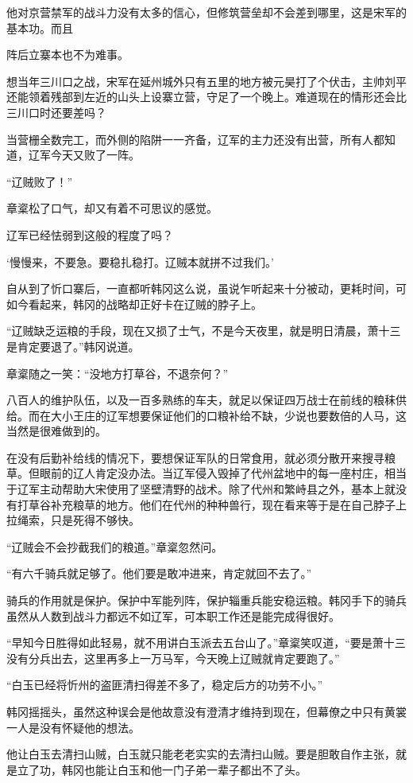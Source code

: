 他对京营禁军的战斗力没有太多的信心，但修筑营垒却不会差到哪里，这是宋军的基本功。而且

阵后立寨本也不为难事。

想当年三川口之战，宋军在延州城外只有五里的地方被元昊打了个伏击，主帅刘平还能领着残部到左近的山头上设寨立营，守足了一个晚上。难道现在的情形还会比三川口时还要差吗？

当营栅全数完工，而外侧的陷阱一一齐备，辽军的主力还没有出营，所有人都知道，辽军今天又败了一阵。

“辽贼败了！”

章楶松了口气，却又有着不可思议的感觉。

辽军已经怯弱到这般的程度了吗？

‘慢慢来，不要急。要稳扎稳打。辽贼本就拼不过我们。’

自从到了忻口寨后，一直都听韩冈这么说，虽说乍听起来十分被动，更耗时间，可如今看起来，韩冈的战略却正好卡在辽贼的脖子上。

“辽贼缺乏运粮的手段，现在又损了士气，不是今天夜里，就是明日清晨，萧十三是肯定要退了。”韩冈说道。

章楶随之一笑：“没地方打草谷，不退奈何？”

八百人的维护队伍，以及一百多熟练的车夫，就足以保证四万战士在前线的粮秣供给。而在大小王庄的辽军想要保证他们的口粮补给不缺，少说也要数倍的人马，这当然是很难做到的。

在没有后勤补给线的情况下，要想保证军队的日常食用，就必须分散开来搜寻粮草。但眼前的辽人肯定没办法。当辽军侵入毁掉了代州盆地中的每一座村庄，相当于辽军主动帮助大宋使用了坚壁清野的战术。除了代州和繁峙县之外，基本上就没有打草谷补充粮草的地方。他们在代州的种种兽行，现在看来等于是在自己脖子上拉绳索，只是死得不够快。

“辽贼会不会抄截我们的粮道。”章楶忽然问。

“有六千骑兵就足够了。他们要是敢冲进来，肯定就回不去了。”

骑兵的作用就是保护。保护中军能列阵，保护辎重兵能安稳运粮。韩冈手下的骑兵虽然从人数到战斗力都远不如辽军，可本职工作还是能完成得很好。

“早知今日胜得如此轻易，就不用讲白玉派去五台山了。”章楶笑叹道，“要是萧十三没有分兵出去，这里再多上一万马军，今天晚上辽贼就肯定要跑了。”

“白玉已经将忻州的盗匪清扫得差不多了，稳定后方的功劳不小。”

韩冈摇摇头，虽然这种误会是他故意没有澄清才维持到现在，但幕僚之中只有黄裳一人是没有怀疑他的想法。

他让白玉去清扫山贼，白玉就只能老老实实的去清扫山贼。要是胆敢自作主张，就是立了功，韩冈也能让白玉和他一门子弟一辈子都出不了头。


